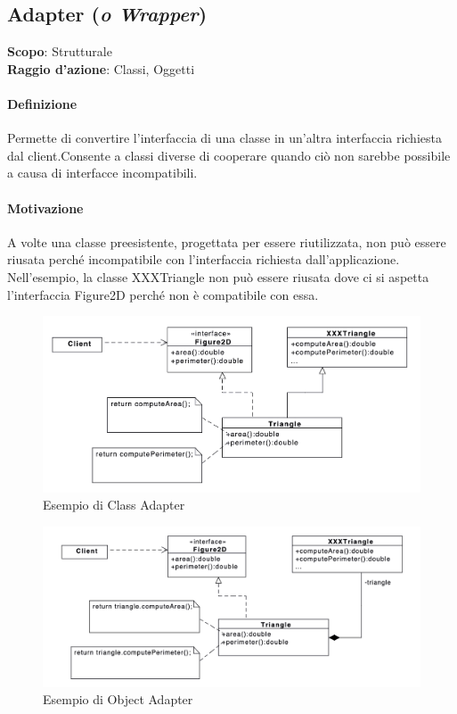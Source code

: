\subsection{Adapter (\textit{o Wrapper})}
\label{adapter}

\textbf{Scopo}: Strutturale \\
\textbf{Raggio d'azione}: Classi, Oggetti

\paragraph{Definizione} Permette di convertire l'interfaccia di una classe in un'altra interfaccia richiesta dal client.Consente a classi diverse di cooperare quando ciò non sarebbe possibile a causa di interfacce incompatibili.

\paragraph{Motivazione} A volte una classe preesistente, progettata per essere riutilizzata, non può essere riusata perché incompatibile con l'interfaccia richiesta dall'applicazione. Nell’esempio, la classe XXXTriangle non può essere riusata dove ci si aspetta l’interfaccia Figure2D perché non è compatibile con essa.

\begin{multicols}{2}
\begin{figure}[H]
    \centering
    \includegraphics[width=1\linewidth]{assets/pattern/adapter/adapter-esempio-class.png}
    \caption{Esempio di Class Adapter}
\end{figure}
\columnbreak
\begin{figure}[H]
    \centering
    \includegraphics[width=1\linewidth]{assets/pattern/adapter/adapter-esempio-object.png}
    \caption{Esempio di Object Adapter}
\end{figure}
\end{multicols}


